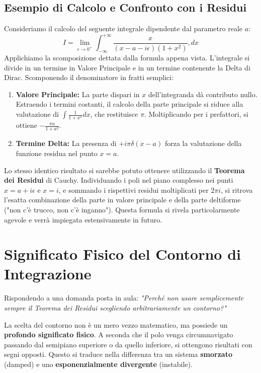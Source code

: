 \subsection{Esempio di Calcolo e Confronto con i Residui}
Consideriamo il calcolo del seguente integrale dipendente dal parametro reale $a$:
\begin{equation}
I = \lim_{\epsilon \to 0^+} \int_{-\infty}^{+\infty} \frac{x}{(x - a - i\epsilon)(1 + x^2)} , dx
\end{equation}
Applichiamo la scomposizione dettata dalla formula appena vista. L'integrale si divide in un termine in Valore Principale e in un termine contenente la Delta di Dirac. Scomponendo il denominatore in fratti semplici:
\begin{enumerate}
\item \textbf{Valore Principale:} La parte dispari in $x$ dell'integranda dà contributo nullo. Estraendo i termini costanti, il calcolo della parte principale si riduce alla valutazione di $\int \frac{1}{1+x^2} dx$, che restituisce $\pi$. Moltiplicando per i prefattori, si ottiene $-\frac{\pi a}{1+a^2}$.
\item \textbf{Termine Delta:} La presenza di $+i\pi \delta(x-a)$ forza la valutazione della funzione residua nel punto $x=a$.
\end{enumerate}

Lo stesso identico risultato si sarebbe potuto ottenere utilizzando il \textbf{Teorema dei Residui} di Cauchy. Individuando i poli nel piano complesso nei punti $x = a + i\epsilon$ e $x = i$, e sommando i rispettivi residui moltiplicati per $2\pi i$, si ritrova l'esatta combinazione della parte in valore principale e della parte deltiforme ("non c'è trucco, non c'è inganno"). Questa formula si rivela particolarmente agevole e verrà impiegata estensivamente in futuro.

\section{Significato Fisico del Contorno di Integrazione}

Rispondendo a una domanda posta in aula: \textit{"Perché non usare semplicemente sempre il Teorema dei Residui scegliendo arbitrariamente un contorno?"}

La scelta del contorno non è un mero vezzo matematico, ma possiede un \textbf{profondo significato fisico}. A seconda che il polo venga circumnavigato passando dal semipiano superiore o da quello inferiore, si ottengono risultati con segni opposti. Questo si traduce nella differenza tra un sistema \textbf{smorzato} (damped) e uno \textbf{esponenzialmente divergente} (instabile).

